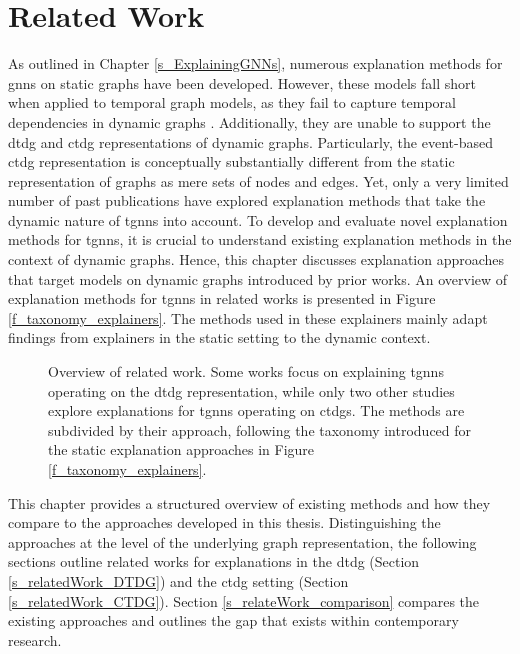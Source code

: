 \section{Related Work}
\label{s_RelatedWork}


As outlined in Chapter \ref{s_ExplainingGNNs}, numerous explanation methods for \glspl{gnn} on static graphs have been developed. However, these models fall short when applied to temporal graph models, as they fail to capture temporal dependencies in dynamic graphs \cite{xia_explaining_2023, he_explainer_2022}. Additionally, they are unable to support the \gls{dtdg} and \gls{ctdg} representations of dynamic graphs. Particularly, the event-based \gls{ctdg} representation is conceptually substantially different from the static representation of graphs as mere sets of nodes and edges. Yet, only a very limited number of past publications have explored explanation methods that take the dynamic nature of \glspl{tgnn} into account. To develop and evaluate novel explanation methods for \glspl{tgnn}, it is crucial to understand existing explanation methods in the context of dynamic graphs. Hence, this chapter discusses explanation approaches that target models on dynamic graphs introduced by prior works. An overview of explanation methods for \glspl{tgnn} in related works is presented in Figure \ref{f_taxonomy_explainers}. The methods used in these explainers mainly adapt findings from explainers in the static setting to the dynamic context. 

\begin{figure}[ht]
    \centering
    
    \label{f_relatedWork_taxonomy}
    \caption{Overview of related work. Some works focus on explaining \glspl{tgnn} operating on the \gls{dtdg} representation, while only two other studies explore explanations for \glspl{tgnn} operating on \glspl{ctdg}. The methods are subdivided by their approach, following the taxonomy introduced for the static explanation approaches in Figure \ref{f_taxonomy_explainers}.}
\end{figure}

This chapter provides a structured overview of existing methods and how they compare to the approaches developed in this thesis. Distinguishing the approaches at the level of the underlying graph representation, the following sections outline related works for explanations in the \gls{dtdg} (Section \ref{s_relatedWork_DTDG}) and the \gls{ctdg} setting (Section \ref{s_relatedWork_CTDG}). Section \ref{s_relateWork_comparison} compares the existing approaches and outlines the gap that exists within contemporary research.

